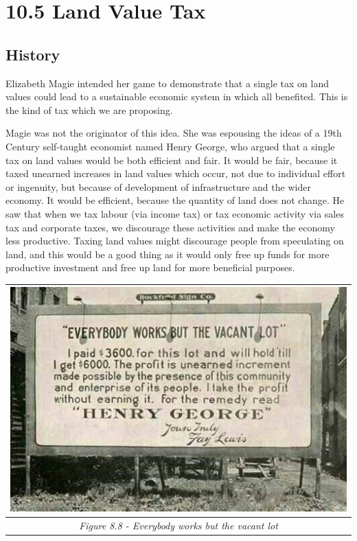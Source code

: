 \documentclass[]{tufte-handout}
\begin{document}
\hypertarget{land-value-tax}{%
\section{10.5 Land Value Tax}\label{land-value-tax}}

\hypertarget{history}{%
\subsection{History}\label{history}}

Elizabeth Magie intended her game to demonstrate that a single tax on
land values could lead to a sustainable economic system in which all
benefited. This is the kind of tax which we are proposing.

Magie was not the originator of this idea. She was espousing the ideas
of a 19th Century self-taught economist named Henry George, who argued
that a single tax on land values would be both efficient and fair. It
would be fair, because it taxed unearned increases in land values which
occur, not due to individual effort or ingenuity, but because of
development of infrastructure and the wider economy. It would be
efficient, because the quantity of land does not change. He saw that
when we tax labour (via income tax) or tax economic activity via sales
tax and corporate taxes, we discourage these activities and make the
economy less productive. Taxing land values might discourage people from
speculating on land, and this would be a good thing as it would only
free up funds for more productive investment and free up land for more
beneficial purposes.

\begin{longtable}[]{@{}c@{}}
\toprule
\includegraphics{ChapterPictures/8-8-GeorgeSign.jpg}\tabularnewline
\midrule
\endhead
\emph{Figure 8.8 - Everybody works but the vacant lot}\tabularnewline
\bottomrule
\end{longtable}
\end{document}
